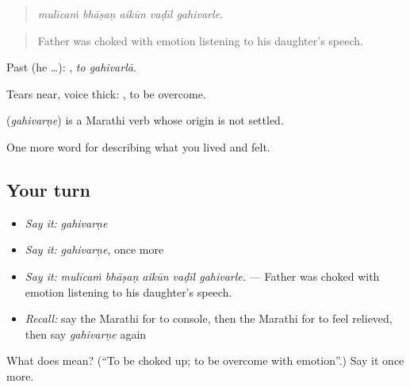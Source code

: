 \begin{quote}
\emph{mulīcaṁ bhāṣaṇ aikūn vaḍīl gahivarle.}
\end{quote}

\begin{quote}
Father was choked with emotion listening to his daughter's speech.
\end{quote}

Past (he …):  , \emph{to gahivarlā}.

Tears near, voice thick:  , to be overcome.

\begin{cousinweb}
\textbf{} (\emph{gahivarṇe}) is a Marathi verb whose origin is not settled.
\end{cousinweb}

\begin{grammarlens}[title={What you've built}]
One more word for describing what you lived and felt.
\end{grammarlens}

\subsection*{Your turn}
\begin{itemize}
\raggedright
  \item \emph{Say it:} \emph{gahivarṇe}
  \item \emph{Say it:} \emph{gahivarṇe}, once more
  \item \emph{Say it:} \emph{mulīcaṁ bhāṣaṇ aikūn vaḍīl gahivarle.} — Father was choked with emotion listening to his daughter's speech.
  \item \emph{Recall:} say the Marathi for to console, then the Marathi for to feel relieved, then say \emph{gahivarṇe} again
\end{itemize}

\begin{tcolorbox}[breakable,colback=teal!4,colframe=teal!35!black,title={Before you move on}]
What does  mean? (\textquotedblleft{}To be choked up; to be overcome with emotion\textquotedblright{}.) Say it once more.
\end{tcolorbox}
